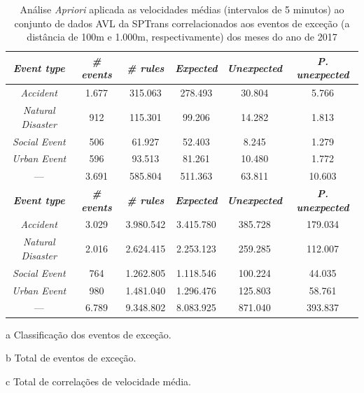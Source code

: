 \documentclass[
	12pt,				%
	oneside,			%
	a4paper,			%
	english,			%
	brazil				%
	]{abntex2ppgsi}
\begin{document}
\begin{table}[!htb]
\centering
\begin{threeparttable}
\caption {Análise \textit{Apriori} aplicada as velocidades médias (intervalos de 5 minutos) ao conjunto de dados AVL da SPTrans correlacionados aos eventos de exceção (a distância de 100m e 1.000m, respectivamente) dos meses do ano de 2017}
\label {tab:aprioriFull}
\begin{tabular}{c|c|c|c|c|c}
\toprule
\textbf{\textit{Event type}}\tnote{a} & \textbf{\textit{\# events}}\tnote{b} & \textit{\textbf{\# rules}}\tnote{c} & \textbf{\textit{Expected}}\tnote{d} & \textbf{\textit{Unexpected}}\tnote{e} & \textbf{\textit{P. unexpected}}\tnote{f}   \\
\midrule
\textit{Accident} & 1.677 & 315.063 & 278.493 & 30.804 & 5.766 \\
\hline
\textit{Natural Disaster} & 912 & 115.301 & 99.206 & 14.282 & 1.813 \\
\hline
\textit{Social Event} & 506 & 61.927 & 52.403 & 8.245 & 1.279 \\
\hline
\textit{Urban Event} & 596 & 93.513 & 81.261 & 10.480 & 1.772 \\
\midrule
{---} & 3.691 & 585.804 & 511.363 & 63.811 & 10.603 \\
\bottomrule
\toprule
\textbf{\textit{Event type}}\tnote{a} & \textbf{\textit{\# events}}\tnote{b} & \textit{\textbf{\# rules}}\tnote{c} & \textbf{\textit{Expected}}\tnote{d} & \textbf{\textit{Unexpected}}\tnote{e} & \textbf{\textit{P. unexpected}}\tnote{f}   \\
\midrule
\textit{Accident} & 3.029 & 3.980.542 & 3.415.780 & 385.728 & 179.034 \\
\textit{Natural Disaster} & 2.016 & 2.624.415 & 2.253.123 & 259.285 & 112.007 \\
\textit{Social Event} & 764 & 1.262.805 & 1.118.546 & 100.224 & 44.035 \\
\textit{Urban Event} & 980 & 1.481.040 & 1.296.476 & 125.803 & 58.761 \\
\midrule
{---} & 6.789 & 9.348.802 & 8.083.925 & 871.040 & 393.837 \\
\bottomrule
\end{tabular}
\begin{tablenotes}
            \item[a] Classificação dos eventos de exceção.
            \item[b] Total de eventos de exceção.
            \item[c] Total de correlações de velocidade média.

\end{tablenotes}
\end{threeparttable}
\end{table}
\end{document}
